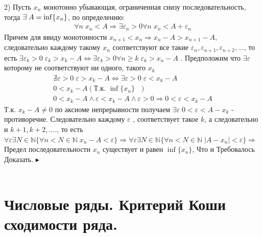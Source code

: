 2) Пусть $ x_n $ монотонно убывающая, ограниченная снизу последовательность, тогда $ \exists\; A= \inf \{x_n \}$, по определению:
\begin{align*}
\forall n \; x_n<A\Rightarrow \exists \varepsilon_n>0 \forall n \; x_n<A+ \varepsilon_n   
\end{align*}
Причем для ввиду монотонности $ x_{n+1}<x_{n} \Rightarrow x_{n}-A>x_{n+1}-A$, следовательно каждому такому $ x_n $ соответствуют все такие  $ \varepsilon_{n}, \varepsilon_{n+1},\varepsilon_{n+2},...$, то есть $ \exists \varepsilon_k>0 \; \varepsilon_k >x_k-A \Leftrightarrow \exists \varepsilon_k>0 \forall n\geqslant k \;\varepsilon_k >x_n-A $ . Предположим что $ \exists \varepsilon $ которому не соответствуют ни одного, такого $ x_k $
\begin{align*}
\nexists\varepsilon>0 \;  \varepsilon>x_k-A  \Leftrightarrow \exists\varepsilon>0 \;  \varepsilon<x_k-A\\
0<x_k-A(\text{Т.к. $\inf\{ x_n\} $ })\\
0<x_k-A\wedge \varepsilon<x_k-A\wedge \varepsilon>0 \Rightarrow  0<\varepsilon<x_k-A
\end{align*}
Т.к. $ x_k-A\neq 0 $ по аксиоме непрерывности получаем $ \exists \varepsilon  \; 0<\varepsilon<A-x_k$ - противоречие. Следовательно каждому $ \varepsilon $ , соответствует такое $ k $, а следовательно и $ k+1,k+2,.... $, то есть $ \forall \varepsilon \exists N \in \mathbb{N} \{\forall n<N \in \mathbb{N} \; x_n-A<\varepsilon\} \Rightarrow \forall \varepsilon \exists N \in \mathbb{N} \{\forall n<N \in \mathbb{N} \; |A-x_n|<\varepsilon\}\Rightarrow$ Предел последовательности $ x_n $ существует и равен $\inf\{ x_n\}   $, Что и Требовалось Доказать.
$\blacktriangleright$ 
\\
\\



\section{Числовые ряды. Критерий Коши сходимости ряда.}

